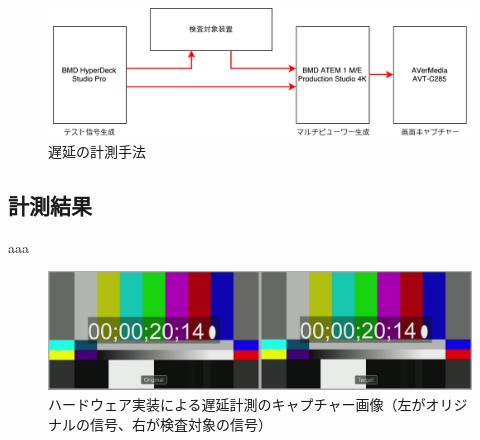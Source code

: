 \begin{figure}[htbp]
  \begin{center}
    \includegraphics[bb=0 0 697 212,width=15cm]{img/evaluate-diagram.pdf}
  \end{center}
  \caption{遅延の計測手法}
  \label{fig:evaluate-diagram}
\end{figure}

\subsection{計測結果}

aaa

\begin{figure}[htbp]
  \begin{center}
    \includegraphics[bb=0 0 1920 540,width=14cm]{img/evaluate-delay.png}
  \end{center}
  \caption[ハードウェア実装による遅延計測のキャプチャー画像]{ハードウェア実装による遅延計測のキャプチャー画像（左がオリジナルの信号、右が検査対象の信号）}
  \label{fig:evaluate-delay}
\end{figure}

